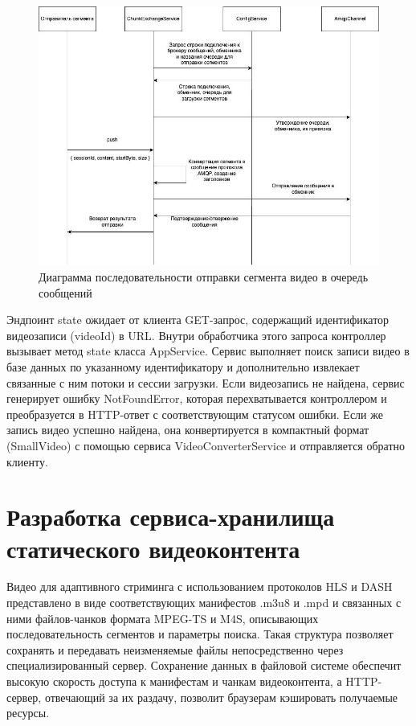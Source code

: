 	\begin{figure}[ht!] 
		\center
		\includegraphics [scale=0.4] {my_folder/images//queue_sending_processes}
		\caption{Диаграмма последовательности отправки сегмента видео в очередь сообщений} 
		\label{fig:queue_sending_processes}  
	\end{figure}

	Эндпоинт state ожидает от клиента GET-запрос, содержащий идентификатор видеозаписи (videoId) в URL. Внутри обработчика этого запроса контроллер вызывает метод state класса AppService. Сервис выполняет поиск записи видео в базе данных по указанному идентификатору и дополнительно извлекает связанные с ним потоки и сессии загрузки. Если видеозапись не найдена, сервис генерирует ошибку NotFoundError, которая перехватывается контроллером и преобразуется в HTTP-ответ с соответствующим статусом ошибки. Если же запись видео успешно найдена, она конвертируется в компактный формат (SmallVideo) с помощью сервиса VideoConverterService и отправляется обратно клиенту.

	\section{Разработка сервиса-хранилища статического видеоконтента}

	Видео для адаптивного стриминга с использованием протоколов HLS и DASH представлено в виде соответствующих манифестов .m3u8 и .mpd и связанных с ними файлов-чанков формата MPEG-TS и M4S, описывающих последовательность сегментов и параметры поиска. Такая структура позволяет сохранять и передавать неизменяемые файлы непосредственно через специализированный сервер. Сохранение данных в файловой системе обеспечит высокую скорость доступа к манифестам и чанкам видеоконтента, а HTTP-сервер, отвечающий за их раздачу, позволит браузерам кэшировать получаемые ресурсы.

